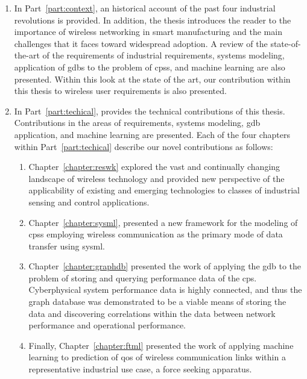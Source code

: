 \begin{enumerate}
	\item In Part~\ref{part:context}, an historical account of the past four industrial revolutions is provided.  In addition, the thesis introduces the reader to the importance of wireless networking in smart manufacturing and the main challenges that it faces toward widespread adoption. A review of the state-of-the-art of the requirements of industrial requirements, systems modeling, application of \glspl{gdb} to the problem of \glspl{cps}, and machine learning are also presented.  Within this look at the state of the art, our contribution within this thesis to wireless user requirements is also presented.
	
	\item In Part~\ref{part:techical}, provides the technical contributions of this thesis. Contributions in the areas of requirements, systems modeling, \gls{gdb} application, and machine learning are presented.  Each of the four chapters within Part~\ref{part:techical} describe our novel contributions as follows:
	\begin{enumerate}
		
		\item Chapter~\ref{chapter:reswk} explored the vast and continually changing landscape of wireless technology and provided new perspective of the applicability of existing and emerging technologies to classes of industrial sensing and control applications.
		
		\item Chapter~\ref{chapter:sysml}, presented a new framework for the modeling of \glspl{cps} employing wireless communication as the primary mode of data transfer using \gls{sysml}.
		
		\item Chapter~\ref{chapter:graphdb} presented the work of applying the \gls{gdb} to the problem of storing and querying performance data of the \gls{cps}.  Cyberphysical system performance data is highly connected, and thus the graph database was demonstrated to be a viable means of storing the data and discovering correlations within the data between network performance and operational performance.
		
		\item Finally, Chapter~\ref{chapter:ftml} presented the work of applying machine learning to prediction of \gls{qos} of wireless communication links within a representative industrial use case, a force seeking apparatus.
	\end{enumerate}
\end{enumerate}




